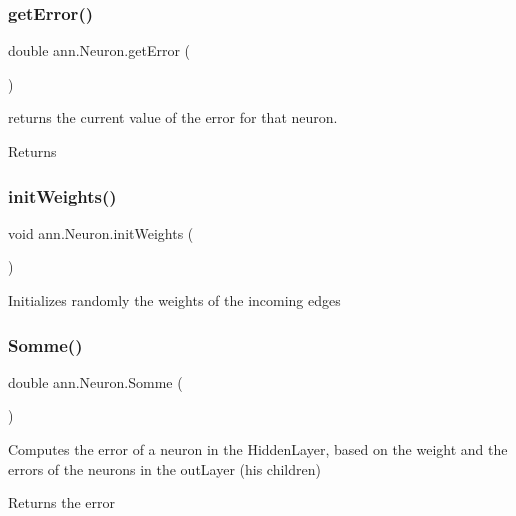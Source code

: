 \subsubsection{\texorpdfstring{get\+Error()}{getError()}}
{\footnotesize\ttfamily double ann.\+Neuron.\+get\+Error (\begin{DoxyParamCaption}{ }\end{DoxyParamCaption})}

returns the current value of the error for that neuron. \begin{DoxyReturn}{Returns}

\end{DoxyReturn}
\mbox{\label{classann_1_1_neuron_aa1544b3c4a7e5a002eef88277126d4f5}} 
\subsubsection{\texorpdfstring{init\+Weights()}{initWeights()}}
{\footnotesize\ttfamily void ann.\+Neuron.\+init\+Weights (\begin{DoxyParamCaption}{ }\end{DoxyParamCaption})}

Initializes randomly the weights of the incoming edges \mbox{\label{classann_1_1_neuron_a159491ed2840497a140c1beeb34c5ce5}} 
\subsubsection{\texorpdfstring{Somme()}{Somme()}}
{\footnotesize\ttfamily double ann.\+Neuron.\+Somme (\begin{DoxyParamCaption}{ }\end{DoxyParamCaption})}

Computes the error of a neuron in the Hidden\+Layer, based on the weight and the errors of the neurons in the out\+Layer (his children) \begin{DoxyReturn}{Returns}
the error 
\end{DoxyReturn}
\mbox{\label{classann_1_1_neuron_a22d903dc7a9e7693b77c3b407359a78a}} 
